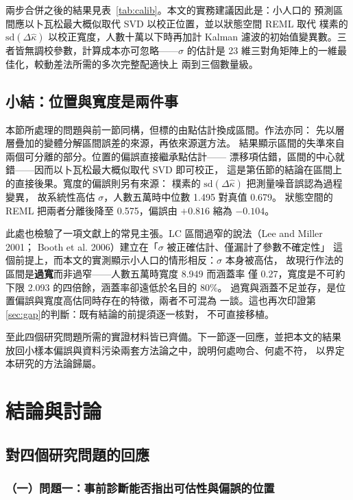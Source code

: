 \documentclass[UTF8, fontset=macnew, a4paper, 12pt]{ctexart}
\begin{document}
兩步合併之後的結果見表~\ref{tab:calib}。本文的實務建議因此是：小人口的
預測區間應以卜瓦松最大概似取代 SVD 以校正位置，並以狀態空間 REML 取代
樸素的 $\mathrm{sd}(\Delta\hat\kappa)$ 以校正寬度，人數十萬以下時再加計
Kalman 濾波的初始值變異數。三者皆無調校參數，計算成本亦可忽略——$\sigma$
的估計是 23 維三對角矩陣上的一維最佳化，較動差法所需的多次完整配適快上
兩到三個數量級。

\subsection{小結：位置與寬度是兩件事}

本節所處理的問題與前一節同構，但標的由點估計換成區間。作法亦同：
先以層層疊加的變體分解區間誤差的來源，再依來源選方法。
結果顯示區間的失準來自兩個可分離的部分。位置的偏誤直接繼承點估計——
漂移項估錯，區間的中心就錯——因而以卜瓦松最大概似取代 SVD 即可校正，
這是第伍節的結論在區間上的直接後果。寬度的偏誤則另有來源：
樸素的 $\mathrm{sd}(\Delta\hat\kappa)$ 把測量噪音誤認為過程變異，
故系統性高估 $\sigma$，人數五萬時中位數 1.495 對真值 0.679。
狀態空間的 REML 把兩者分離後降至 0.575，偏誤由 $+0.816$ 縮為 $-0.104$。

此處也檢驗了一項文獻上的常見主張。LC 區間過窄的說法（Lee and Miller 2001；
Booth et al. 2006）建立在「$\sigma$ 被正確估計、僅漏計了參數不確定性」
這個前提上，而本文的實測顯示小人口的情形相反：$\sigma$ 本身被高估，
故現行作法的區間是\textbf{過寬}而非過窄——人數五萬時寬度 8.949 而涵蓋率
僅 0.27，寬度是不可約下限 2.093 的四倍餘，涵蓋率卻遠低於名目的 80\%。
過寬與涵蓋不足並存，是位置偏誤與寬度高估同時存在的特徵，兩者不可混為
一談。這也再次印證第\ref{sec:gap}的判斷：既有結論的前提須逐一核對，
不可直接移植。

至此四個研究問題所需的實證材料皆已齊備。下一節逐一回應，並把本文的結果
放回小樣本偏誤與資料污染兩套方法論之中，說明何處吻合、何處不符，
以界定本研究的方法論歸屬。

\section{結論與討論}

\subsection{對四個研究問題的回應}

\subsubsection{（一）問題一：事前診斷能否指出可估性與偏誤的位置}
\end{document}
